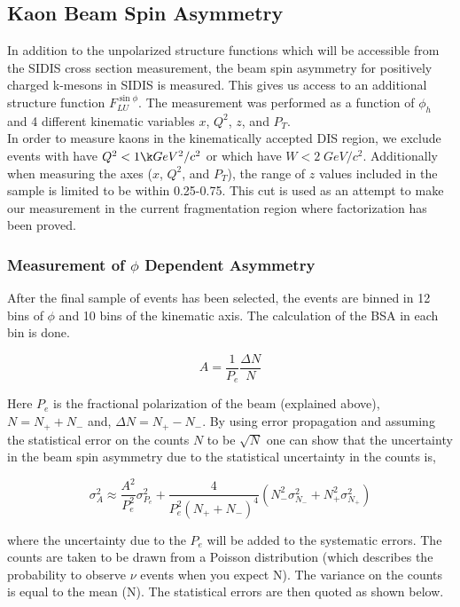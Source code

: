 \subsection{Kaon Beam Spin Asymmetry}

In addition to the unpolarized structure functions which will be accessible from the SIDIS cross section measurement, the beam spin asymmetry for positively charged k-mesons in SIDIS is measured.  This gives us access to an additional structure function $F_{LU}^{\sin\phi}$.  The measurement was performed as a function of $\phi_h$ and 4 different kinematic variables $x$, $Q^2$, $z$, and $P_T$.  \\

In order to measure kaons in the kinematically accepted DIS region, we exclude events with have $Q^2 < 1 \k GeV^2/c^2$ or which have $W < 2 \; GeV/c^2$.  Additionally when measuring the axes ($x$, $Q^2$, and $P_T$), the range of $z$ values included in the sample is limited to be within 0.25-0.75.  This cut is used as an attempt to make our measurement in the current fragmentation region where factorization has been proved.  


\subsubsection{Measurement of $\phi$ Dependent Asymmetry}
After the final sample of events has been selected, the events are binned in 12 bins of $\phi$ and 10 bins of the kinematic axis.  The calculation of the BSA in each bin is done.

\begin{equation}
  A = \frac{1}{P_e} \frac{\Delta N}{N}
\end{equation}

Here $P_e$ is the fractional polarization of the beam (explained above), $N = N_+ + N_-$ and, $\Delta N = N_+ - N_-$.  By using error propagation and assuming the statistical error on the counts $N$ to be $\sqrt{N}$ one can show that the uncertainty in the beam spin asymmetry due to the statistical uncertainty in the counts is,

\begin{equation}
  \sigma_A^2 \approx \frac{A^2}{P_e^2} \sigma_{P_e}^2 + \frac{4}{P_e^2 (N_+ + N_-)^4}(N_-^2 \sigma_{N_-}^2 + N_+^2 \sigma_{N_+}^2) 
\end{equation}

where the uncertainty due to the $P_e$ will be added to the systematic errors.  The counts are taken to be drawn from a Poisson distribution (which describes the probability to observe $\nu$ events when you expect N).  The variance on the counts is equal to the mean (N).  The statistical errors are then quoted as shown below. 

